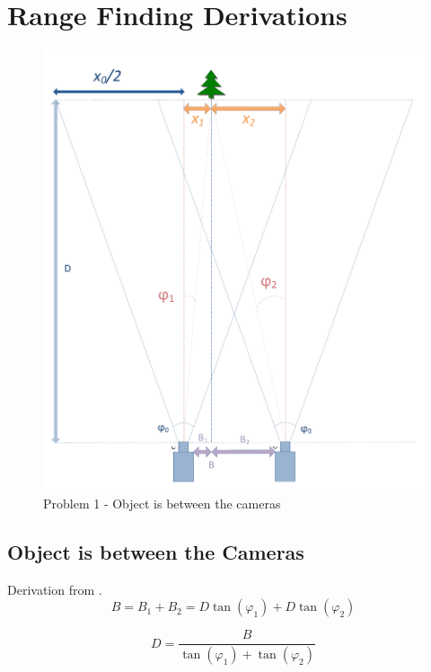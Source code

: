 \chapter{Range Finding Derivations} \label{Appendix:Range}
\begin{figure}
\includegraphics[width=\textwidth,height=\textheight,keepaspectratio]{Figures/problem1.pdf}
\caption{Problem 1 - Object is between the cameras}
\label{problem_between}
\end{figure}

\section{Object is between the Cameras}
Derivation from \cite{Mrovlje:Distance_Stereoscopic}.
\begin{equation} \label{eq:B}
B = B_{1} + B_{2} = D\tan(\varphi_{1}) + D\tan(\varphi_{2})
\end{equation}

\begin{equation} \label{eq:D}
D = \frac{B}{\tan(\varphi_{1}) + \tan(\varphi_{2})}
\end{equation}


